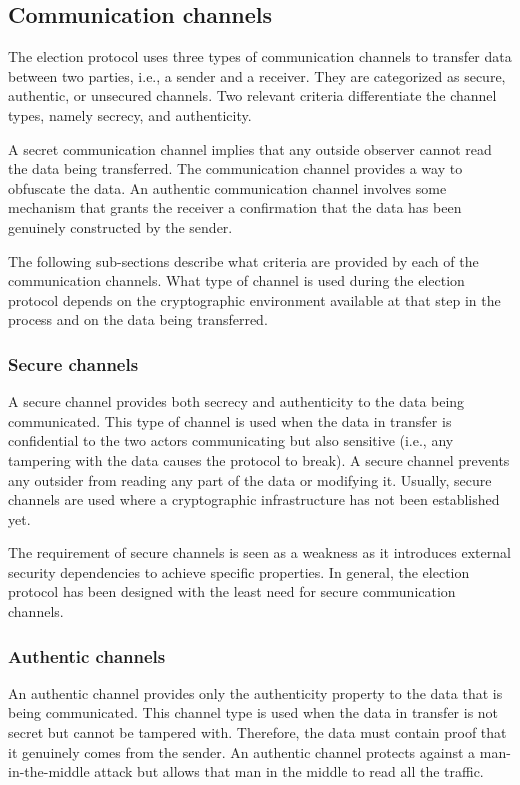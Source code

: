 \subsection{Communication channels} \label{sec: communication channels}
The election protocol uses three types of communication channels to transfer data between two parties, i.e., a sender and a receiver. They are categorized as secure, authentic, or unsecured channels. Two relevant criteria differentiate the channel types, namely secrecy, and authenticity.

A secret communication channel implies that any outside observer cannot read the data being transferred. The communication channel provides a way to obfuscate the data. An authentic communication channel involves some mechanism that grants the receiver a confirmation that the data has been genuinely constructed by the sender.

The following sub-sections describe what criteria are provided by each of the communication channels. What type of channel is used during the election protocol depends on the cryptographic environment available at that step in the process and on the data being transferred.


\subsubsection{Secure channels}
A secure channel provides both secrecy and authenticity to the data being communicated. This type of channel is used when the data in transfer is confidential to the two actors communicating but also sensitive (i.e., any tampering with the data causes the protocol to break). A secure channel prevents any outsider from reading any part of the data or modifying it. Usually, secure channels are used where a cryptographic infrastructure has not been established yet.

The requirement of secure channels is seen as a weakness as it introduces external security dependencies to achieve specific properties. In general, the election protocol has been designed with the least need for secure communication channels.

\subsubsection{Authentic channels}
An authentic channel provides only the authenticity property to the data that is being communicated. This channel type is used when the data in transfer is not secret but cannot be tampered with. Therefore, the data must contain proof that it genuinely comes from the sender. An authentic channel protects against a man-in-the-middle attack but allows that man in the middle to read all the traffic.

